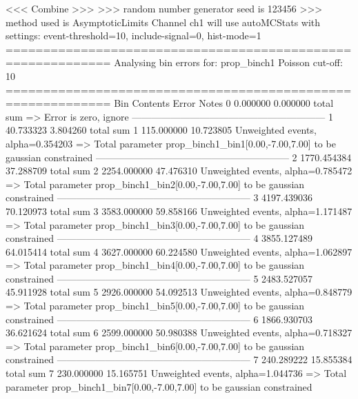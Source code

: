  <<< Combine >>> 
>>> random number generator seed is 123456
>>> method used is AsymptoticLimits
Channel ch1 will use autoMCStats with settings: event-threshold=10, include-signal=0, hist-mode=1
============================================================
Analysing bin errors for: prop_binch1
Poisson cut-off: 10
============================================================
Bin        Contents        Error           Notes                         
0          0.000000        0.000000        total sum                     
  => Error is zero, ignore      
------------------------------------------------------------
1          40.733323       3.804260        total sum                     
1          115.000000      10.723805       Unweighted events, alpha=0.354203
  => Total parameter prop_binch1_bin1[0.00,-7.00,7.00] to be gaussian constrained
------------------------------------------------------------
2          1770.454384     37.288709       total sum                     
2          2254.000000     47.476310       Unweighted events, alpha=0.785472
  => Total parameter prop_binch1_bin2[0.00,-7.00,7.00] to be gaussian constrained
------------------------------------------------------------
3          4197.439036     70.120973       total sum                     
3          3583.000000     59.858166       Unweighted events, alpha=1.171487
  => Total parameter prop_binch1_bin3[0.00,-7.00,7.00] to be gaussian constrained
------------------------------------------------------------
4          3855.127489     64.015414       total sum                     
4          3627.000000     60.224580       Unweighted events, alpha=1.062897
  => Total parameter prop_binch1_bin4[0.00,-7.00,7.00] to be gaussian constrained
------------------------------------------------------------
5          2483.527057     45.911928       total sum                     
5          2926.000000     54.092513       Unweighted events, alpha=0.848779
  => Total parameter prop_binch1_bin5[0.00,-7.00,7.00] to be gaussian constrained
------------------------------------------------------------
6          1866.930703     36.621624       total sum                     
6          2599.000000     50.980388       Unweighted events, alpha=0.718327
  => Total parameter prop_binch1_bin6[0.00,-7.00,7.00] to be gaussian constrained
------------------------------------------------------------
7          240.289222      15.855384       total sum                     
7          230.000000      15.165751       Unweighted events, alpha=1.044736
  => Total parameter prop_binch1_bin7[0.00,-7.00,7.00] to be gaussian constrained
